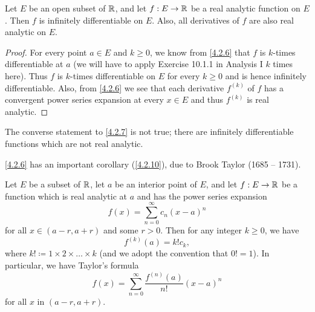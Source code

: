 \begin{cor}\label{4.2.7}
  Let \(E\) be an open subset of \(\mathbb{R}\), and let \(f : E \to \mathbb{R}\) be a real analytic function on \(E\).
  Then \(f\) is infinitely differentiable on \(E\).
  Also, all derivatives of \(f\) are also real analytic on \(E\).
\end{cor}

\begin{proof}
  For every point \(a \in E\) and \(k \geq 0\), we know from \cref{4.2.6} that \(f\) is \(k\)-times differentiable at \(a\)
  (we will have to apply Exercise 10.1.1 in Analysis I \(k\) times here).
  Thus \(f\) is \(k\)-times differentiable on \(E\) for every \(k \geq 0\) and is hence infinitely differentiable.
  Also, from \cref{4.2.6} we see that each derivative \(f^{(k)}\) of \(f\) has a convergent power series expansion at every \(x \in E\) and thus \(f^{(k)}\) is real analytic.
\end{proof}

\setcounter{thm}{8}
\begin{rmk}\label{4.2.9}
  The converse statement to \cref{4.2.7} is not true;
  there are infinitely differentiable functions which are not real analytic.
\end{rmk}

\begin{note}
  \cref{4.2.6} has an important corollary (\cref{4.2.10}), due to Brook Taylor (1685 -- 1731).
\end{note}

\begin{cor}\label{4.2.10}
  Let \(E\) be a subset of \(\mathbb{R}\), let \(a\) be an interior point of \(E\), and let \(f : E \to \mathbb{R}\) be a function which is real analytic at \(a\) and has the power series expansion
  \[
    f(x) = \sum_{n = 0}^\infty c_n (x - a)^n
  \]
  for all \(x \in (a - r, a + r)\) and some \(r > 0\).
  Then for any integer \(k \geq 0\), we have
  \[
    f^{(k)}(a) = k! c_k,
  \]
  where \(k! \coloneqq 1 \times 2 \times \dots \times k\)
  (and we adopt the convention that \(0! = 1\)).
  In particular, we have Taylor's formula
  \[
    f(x) = \sum_{n = 0}^\infty \dfrac{f^{(n)}(a)}{n!} (x - a)^n
  \]
  for all \(x\) in \((a - r, a + r)\).
\end{cor}

